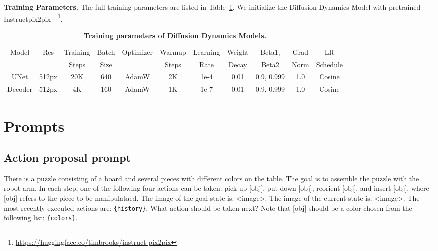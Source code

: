\noindent \textbf{Training Parameters.} The full training parameters are listed in Table~\ref{tab:diffusion_training_params}. We initialize the Diffusion Dynamics Model with pretrained Instructpix2pix~\cite{brooks2022instructpix2pix}~\footnote{\url{https://huggingface.co/timbrooks/instruct-pix2pix}}.

\begin{table}[h]
\caption{\textbf{Training parameters of Diffusion Dynamics Models.}}
\label{tab:diffusion_training_params}
\centering
\begin{tabular}{c|cccccccccc}
\toprule
\multirow{2}{*}{Model} & \multirow{2}{*}{Res} & Training & Batch & \multirow{2}{*}{Optimizer} & Warmup & Learning & Weight & Beta1,     & Grad & LR       \\
                       &                      & Steps    & Size  &                            & Steps  & Rate     & Decay  & Beta2      & Norm & Schedule \\
                       \midrule
UNet         & 512px                & 20K      & 640   & AdamW                      & 2K     & 1e-4     & 0.01   & 0.9, 0.999 & 1.0  & Cosine   \\
Decoder         & 512px                & 4K       & 160   & AdamW                      & 1K     & 1e-7     & 0.01   & 0.9, 0.999 & 1.0  & Cosine  
\\
\bottomrule
\end{tabular}
\end{table}


\section{Prompts}\label{sec:app_prompts}

\subsection{Action proposal prompt}
\label{subsec:prompt}

\begin{tcolorbox}[width=\textwidth, colback=gray!10, colframe=black, boxrule=0.8pt]
There is a puzzle consisting of a board and several pieces with different colors on the table. The goal is to assemble the puzzle with the robot arm. In each step, one of the following four actions can be taken: pick up [obj], put down [obj], reorient [obj], and insert [obj], where [obj] refers to the piece to be manipulataed. The image of the goal state is: \textless image\textgreater. The image of the current state is: \textless image\textgreater. The most recently executed actions are: {\tt\{history\}}. What action should be taken next? Note that [obj] should be a color chosen from the following list: {\tt\{colors\}}.
\end{tcolorbox}

